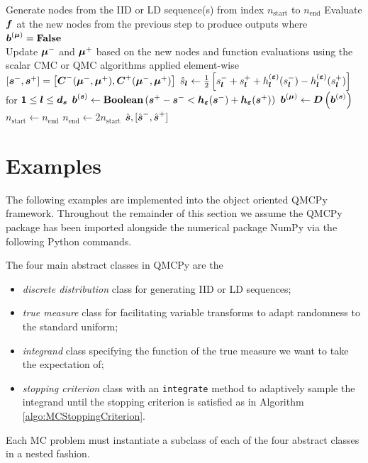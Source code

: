 \documentclass{article}[12pt]
\begin{document}
\begin{algorithm}[t]
\begin{algorithmic}
     
        \State Generate nodes from the IID or LD sequence(s) from index $n_\text{start}$ to $n_\text{end}$
        \State Evaluate $\bf$ at the new nodes from the previous step to produce outputs where $\bb^{(\bmu)}=\textbf{\False}$ \\ 
        \State Update $\bmu^-$ and $\bmu^+$ based on the new nodes and function evaluations using the scalar CMC or QMC algorithms applied element-wise 
        \State $[\bs^-,\bs^+] = \left[\bC^-(\bmu^-,\bmu^+),\bC^+(\bmu^-,\bmu^+)\right]$ 
        \State $\hat{s}_{\bl} \gets \frac{1}{2}\left[s_{\bl}^-+s_{\bl}^++h^{(\bvarepsilon)}_{\bl}(s_{\bl}^-)-h^{(\bvarepsilon)}_{\bl}(s_{\bl}^+)\right]$ for $\boldsymbol{1} \leq \bl \leq \bd_{\bs}$ 
        \State $\bb^{(\bs)} \gets \textbf{Boolean}\left(\bs^+-\bs^- < \bh_{\bvarepsilon}(\bs^-)+\bh_{\bvarepsilon}(\bs^+)\right)$ 
        \State $\bb^{(\bmu)} \gets \bD\left(\bb^{(\bs)}\right)$
        \State $n_\text{start} \gets n_\text{end}$
        \State $n_\text{end} \gets 2n_\text{start}$
    \EndWhile
    \State \Return $\hat{\bs},[\hat{\bs}^-,\hat{\bs}^+]$
    \end{algorithmic}
\end{algorithm}

\section{Examples} \label{sec:examples}

The following examples are implemented into the object oriented QMCPy framework. Throughout the remainder of this section we assume the QMCPy package \cite{QMCPy} has been imported alongside the numerical package NumPy \cite{numpy} via the following Python commands. 

The four main abstract classes in QMCPy are the 
\begin{itemize}
    \item \emph{discrete distribution} class for generating IID or LD sequences;
    \item \emph{true measure} class for facilitating variable transforms to adapt randomness to the standard uniform;
    \item \emph{integrand} class specifying the function of the true measure we want to take the expectation of; 
    \item \emph{stopping criterion} class with an \texttt{integrate} method to adaptively sample the integrand until the stopping criterion is satisfied as in Algorithm \ref{algo:MCStoppingCriterion}.
\end{itemize}
Each MC problem must instantiate a subclass of each of the four abstract classes in a nested fashion. 
\end{document}
